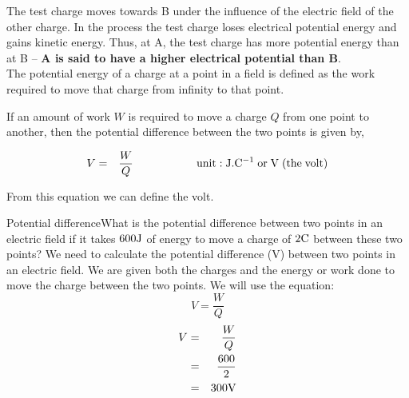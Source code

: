 The test charge moves towards B under the influence of the
electric field of the other charge.
In the process the test charge loses electrical potential energy
and gains kinetic energy. Thus, at A, the test charge has more
potential energy than at B -- {\bf A is said to have a higher
electrical potential than B}. \\

The potential energy of a charge at
a point in a field is defined as the work required to move that
charge from infinity to that point.

If an amount of work $W$ is required to move a charge
$Q$ from one point to another, then the potential difference
between the two points is given by,

\begin{eqnarray}
V &=&{W\over Q}\nonumber\hspace{2cm}
\mathrm{unit:J.C^{-1}\;or\;V\;(the\;volt)}
\end{eqnarray}

From this equation we can define the volt.


\begin{wex}{Potential difference}{What is the potential difference between two points in an electric field if it takes $600 {\rm J}$ of energy to move a charge of $2 {\rm C}$ between these two points?}{
We need to calculate the potential difference (V) between two points in an electric field.
We are given both the charges and the energy or work done to move the charge between the two points.
We will use the equation:\\
\begin{equation*}
V=\frac{W}{Q}
\end{equation*}
\begin{eqnarray*}
V &=& \frac{W}{Q}\\
&=& \frac {600}{2}\\
&=& 300 {\rm V}\\
\end{eqnarray*}}
\end{wex}



